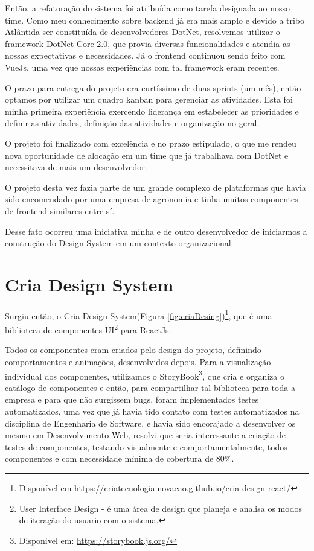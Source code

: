 Então, a refatoração do sistema foi atribuída como tarefa designada ao nosso time.
Como meu conhecimento sobre backend já era mais amplo e devido a tribo Atlântida ser constituída de desenvolvedores DotNet, resolvemos utilizar o framework DotNet Core 2.0, que 
provia diversas funcionalidades e atendia as nossas expectativas e necessidades.
Já o frontend continuou sendo feito com VueJs, uma vez que nossas experiências com tal framework eram recentes.

O prazo para entrega do projeto era curtíssimo de duas sprints (um mês), então optamos por utilizar um quadro kanban para gerenciar as atividades.
Esta foi minha primeira experiência exercendo liderança em estabelecer as prioridades e definir as atividades, definição das atividades e organização no geral.

O projeto foi finalizado com excelência e no prazo estipulado, o que me rendeu nova oportunidade de alocação em um time que já trabalhava com DotNet e necessitava de mais um desenvolvedor.

O projeto desta vez fazia parte de um grande complexo de plataformas que havia sido encomendado por uma empresa de agronomia e tinha muitos componentes de frontend similares entre sí.

Desse fato ocorreu uma iniciativa minha e de outro desenvolvedor de iniciarmos a construção do Design System em um contexto organizacional.

\section{Cria Design System}
Surgiu então, o Cria Design System(Figura \ref{fig:criaDesing})\footnote{Disponível em \url{https://criatecnologiainovacao.github.io/cria-design-react/}}, que é uma biblioteca de componentes UI\footnote{User Interface Design - é uma área de design que planeja e analisa os modos de iteração do usuario com o sistema.} para ReactJs.

Todos os componentes eram criados pelo design do projeto, definindo comportamentos e animações, desenvolvidos depois. Para a visualização individual dos componentes, utilizamos o StoryBook\footnote{Disponivel em: \url{https://storybook.js.org/}},
que cria e organiza o catálogo de componentes e então, para compartilhar tal biblioteca para toda a empresa e para que não surgissem bugs, foram implementados testes automatizados, 
uma vez que já havia tido contato com testes automatizados na disciplina de Engenharia de Software, e havia sido encorajado a desenvolver os mesmo em Desenvolvimento Web, resolvi que seria interessante a criação de testes de componentes, testando visualmente e comportamentalmente,
todos componentes e com necessidade mínima de cobertura de 80\%.

